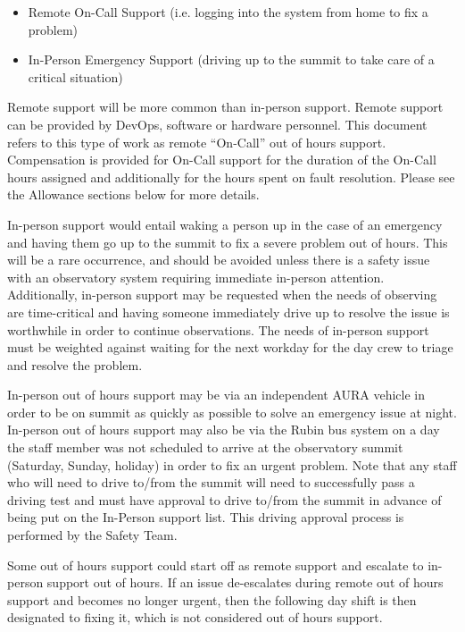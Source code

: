 \begin{itemize}
    \item Remote On-Call Support (i.e. logging into the system from home to fix a problem)
    \item In-Person Emergency Support (driving up to the summit to take care of a critical situation)
\end{itemize}

Remote support will be more common than in-person support.  
Remote support can be provided by DevOps, software or hardware personnel.  
This document refers to this type of work as remote ``On-Call'' out of hours support. 
Compensation is provided for On-Call support for the duration of the On-Call hours assigned and additionally for the hours spent on fault resolution.  
Please see the Allowance sections below for more details.

In-person support would entail waking a person up in the case of an emergency and having them go up to the summit to fix a severe problem out of hours. 
This will be a rare occurrence, and should be avoided unless there is a safety issue with an observatory system requiring immediate in-person attention.
Additionally, in-person support may be requested when the needs of observing are time-critical and having someone immediately drive up to resolve the issue is worthwhile in order to continue observations.  
The needs of in-person support must be weighted against waiting for the next workday for the day crew to triage and resolve the problem.

In-person out of hours support may be via an independent AURA vehicle in order to be on summit as quickly as possible to solve an emergency issue at night.  
In-person out of hours support may also be via the Rubin bus system on a day the staff member was not scheduled to arrive at the observatory summit (Saturday, Sunday, holiday) in order to fix an urgent problem.  
Note that any staff who will need to drive to/from the summit will need to successfully pass a driving test and must have approval to drive to/from the summit in advance of being put on the In-Person support list.  
This driving approval process is performed by the Safety Team.

Some out of hours support could start off as remote support and escalate to in-person support out of hours.  
If an issue de-escalates during remote out of hours support and becomes no longer urgent, then the following day shift is then designated to fixing it, which is not considered out of hours support.

